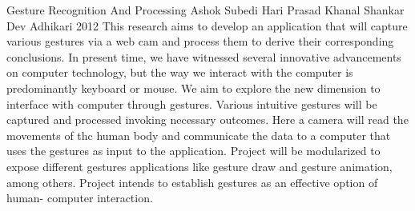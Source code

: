 \begin{conf-abstract}[]
 {Gesture Recognition And Processing}
{
	Ashok Subedi
	Hari Prasad Khanal
	Shankar Dev Adhikari
}
{2012}
This research aims to develop an application that will capture various
gestures via a web cam and process them to derive their corresponding
conclusions. In present time, we have witnessed several innovative
advancements on computer technology, but the way we interact with the
computer is predominantly keyboard or mouse. We aim to explore the
new dimension to interface with computer through gestures. Various
intuitive gestures will be captured and processed invoking necessary
outcomes. Here a camera will read the movements of thc human body
and communicate the data to a computer that uses the gestures as input to
the application. Project will be modularized to expose different gestures
applications like gesture draw and gesture animation, among others.
Project intends to establish gestures as an effective option of human-
computer interaction.
  \end{conf-abstract}